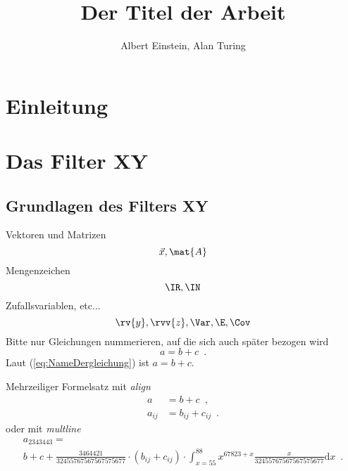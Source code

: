 \documentclass[cover]{isas-seminar}
\title{Der Titel der Arbeit}
\author{Albert Einstein, Alan Turing}
\begin{document}
\maketitle

\begin{abstract}
\end{abstract}
\clearpage
\tableofcontents
\cleardoublepage

\section{Einleitung}

\section{Das Filter XY}

\subsection{Grundlagen des Filters XY}
Vektoren und Matrizen
%
\begin{equation*}
  \vec{x}, \mat{A}
\end{equation*}
%
Mengenzeichen
%
\begin{equation*}
  \IR, \IN
\end{equation*}
%
Zufallsvariablen, etc...
%
\begin{equation*}
  \rv{y}, \rvv{z},
  \Var, \E, \Cov
\end{equation*}
%
Bitte nur Gleichungen nummerieren, auf die sich auch später bezogen wird
%
\begin{equation}
  a = b +c \enspace .
  \label{eq:NameDergleichung}
\end{equation}
%
Laut (\ref{eq:NameDergleichung}) ist $a=b+c$.

Mehrzeiliger Formelsatz mit \emph{align}
%
\begin{align*}
  a &= b + c \enspace ,\\
  a_{ij} &= b_{ij} + c_{ij} \enspace .
\end{align*}
%
oder mit \emph{multline}
%
\begin{multline*}
  a_{2343443} = \\
  b + c + \frac{3464421}{32455767567567575677} 
  \cdot \left( b_{ij} + c_{ij} \right)
  \cdot \int_{x=55}^{88} x^{67823+x} \frac{x}{32455767567567575677} \text{d}x
  \enspace .
\end{multline*}
%
\end{document}
